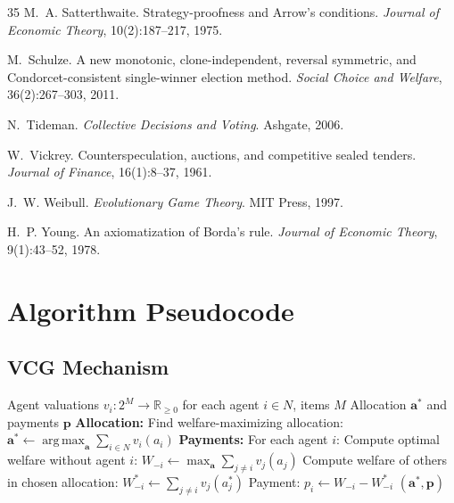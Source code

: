 \documentclass[10pt]{article}
\DeclareMathOperator*{\argmax}{arg\,max}
\begin{document}
\begin{thebibliography}{35}
M.~A. Satterthwaite.
\newblock Strategy-proofness and Arrow's conditions.
\newblock \emph{Journal of Economic Theory}, 10(2):187--217, 1975.

M.~Schulze.
\newblock A new monotonic, clone-independent, reversal symmetric, and
  Condorcet-consistent single-winner election method.
\newblock \emph{Social Choice and Welfare}, 36(2):267--303, 2011.

N.~Tideman.
\newblock \emph{Collective Decisions and Voting}.
\newblock Ashgate, 2006.

W.~Vickrey.
\newblock Counterspeculation, auctions, and competitive sealed tenders.
\newblock \emph{Journal of Finance}, 16(1):8--37, 1961.

J.~W. Weibull.
\newblock \emph{Evolutionary Game Theory}.
\newblock MIT Press, 1997.

H.~P. Young.
\newblock An axiomatization of Borda's rule.
\newblock \emph{Journal of Economic Theory}, 9(1):43--52, 1978.

\end{thebibliography}

\appendix
\newpage

\section{Algorithm Pseudocode}
\label{app:algorithms}

\subsection{VCG Mechanism}
\label{app:vcg}

\begin{algorithm}[H]
\caption{Vickrey--Clarke--Groves (VCG) Mechanism}
\label{alg:vcg}
\begin{algorithmic}[1]
\REQUIRE Agent valuations $v_i: 2^M \to \mathbb{R}_{\geq 0}$ for each agent $i \in N$, items $M$
\ENSURE Allocation $\mathbf{a}^*$ and payments $\mathbf{p}$
\STATE \textbf{Allocation:} Find welfare-maximizing allocation:
\STATE $\mathbf{a}^* \leftarrow \argmax_{\mathbf{a}} \sum_{i \in N} v_i(a_i)$
\STATE \textbf{Payments:} For each agent $i$:
\STATE Compute optimal welfare without agent $i$:
\STATE $W_{-i} \leftarrow \max_{\mathbf{a}} \sum_{j \neq i} v_j(a_j)$
\STATE Compute welfare of others in chosen allocation:
\STATE $W_{-i}^* \leftarrow \sum_{j \neq i} v_j(a_j^*)$
\STATE Payment: $p_i \leftarrow W_{-i} - W_{-i}^*$ 
\RETURN $(\mathbf{a}^*, \mathbf{p})$
\end{algorithmic}
\end{algorithm}
\end{document}

